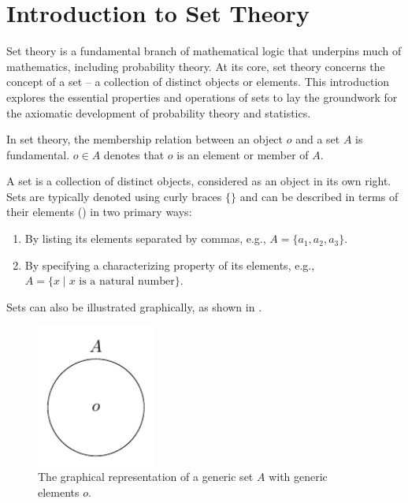 \chapter{Introduction to Set Theory}
\label{chp:set_theory}
Set theory is a fundamental branch of mathematical logic that underpins much of mathematics, including probability theory. At its core, set theory concerns the concept of a set -- a collection of distinct objects or elements. This introduction explores the essential properties and operations of sets to lay the groundwork for the axiomatic development of probability theory and statistics.


\begin{definition}[Membership]
	\label{def:membership}
	In set theory, the membership relation between an object $o$ and a set $A$ is fundamental. $o \in A$ denotes that $o$ is an element or member of $A$.
\end{definition}

\begin{definition}[Set]
	\label{def:set}
	A set is a collection of distinct objects, considered as an object in its own right. Sets are typically denoted using curly braces $\{\}$ and can be described in terms of their elements () in two primary ways:
	\begin{enumerate}
		\item By listing its elements  separated by commas, e.g., $A = \{a_1, a_2, a_3\}$.
		\item By specifying a characterizing property of its elements, e.g., \newline $A = \{x \mid x \text{ is a natural number}\}$.
	\end{enumerate}
	Sets can also be illustrated graphically, as shown in .
	\begin{figure}[H]
		\centering
		\includegraphics[width = 0.35\textwidth]{figures/generic_set.pdf}
		\caption{The graphical representation of a generic set $A$ with generic elements $o$.}
		\label{fig:generic_set}
	\end{figure}
\end{definition}

